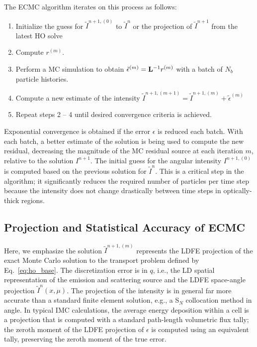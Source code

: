 The ECMC algorithm iterates on this process as follows:
\begin{enumerate}
    \item Initialize the guess for $\tilde{I}^{n+1,(0)}$ to $\tilde{I}^{n}$ or the
        projection of $\tilde{I}^{n+1}$ from the latest HO solve
\item Compute $r^{(m)}$.
\item Perform a MC simulation to obtain $\tilde{\epsilon}^{(m)} = \mathbf{L}^{-1} r^{(m)}$ with
    a batch of $N_b$ particle histories.
\item Compute a new estimate of the intensity $\tilde I^{n+1,(m+1)} = \tilde I^{n+1,(m)}
+ \tilde\epsilon^{(m)}$
\item Repeat steps 2 -- 4 until desired convergence criteria is achieved. 
\end{enumerate}
Exponential convergence is obtained if the error $\epsilon$ is reduced each batch.  With each batch, a
better estimate of the solution is being used to compute the new residual, decreasing
the magnitude of the MC residual source at each iteration $m$, relative to the solution
$I^{n+1}$.
The initial guess for the angular intensity $I^{n+1,(0)}$ is computed based on the previous solution
for $\tilde{I}^{n}$. This is a critical step in the algorithm; it significantly reduces the required number of
particles per time step because the intensity does not change drastically between time steps in
optically-thick regions.  


\subsection{Projection and Statistical Accuracy of ECMC}

Here, we emphasize the solution $\tilde{I}^{n+1,(m)}$ represents the LDFE projection of the exact Monte Carlo
solution to the transport problem defined by Eq.~\eqref{eq:ho_base}.  The discretization error is in $q$, i.e., the LD spatial
representation of the emission and scattering source and the LDFE space-angle projection $\tilde I^{n}(x,\mu)$.
 The projection of the intensity is in
general far more accurate than a standard finite element solution, e.g., a S$_N$ collocation method in angle.  In typical IMC calculations, the average
energy deposition within a cell is a projection that is computed with a standard path-length volumetric
flux tally; the zeroth moment of the LDFE projection of ${\epsilon}$ is
computed using an equivalent tally, preserving the zeroth moment of the true error.

